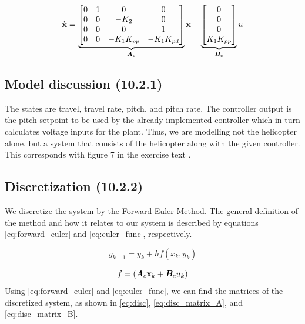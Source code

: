 \begin{equation}\label{eq:state_space_matrices}
	\mathbf{\dot{x}} =
	\underbrace{
		\begin{bmatrix}
			0 & 1 & 0 				& 0 \\
			0 & 0 & -K_{2} 			& 0 \\
			0 & 0 & 0 				& 1 \\
			0 & 0 & -K_{1}K_{pp}	& -K_{1}K_{pd}
		\end{bmatrix}
	}_{\bm{A}_{c}}
	\mathbf{x} +
	\underbrace{
		\begin{bmatrix}
			0 \\ 0 \\ 0 \\ K_{1}K_{pp}
		\end{bmatrix}
	}_{\bm{B}_{c}}
	u
\end{equation}


\subsection{Model discussion (10.2.1)}
The states are travel, travel rate, pitch, and pitch rate. The controller output is the pitch setpoint to be used by the already implemented controller which in turn calculates voltage inputs for the plant. Thus, we are modelling not the helicopter alone, but a system that consists of the helicopter along with the given controller. This corresponds with figure 7 in the exercise text \cite{_helicopter_2015}.


\subsection{Discretization (10.2.2)}\label{sec:disc1}
We discretize the system by the Forward Euler Method. The general definition of the method and how it relates to our system is described by equations \eqref{eq:forward_euler} and \eqref{eq:euler_func}, respectively.

\begin{equation}\label{eq:forward_euler}
	y_{k+1} = y_{k} + h f(x_{k}, y_{k})
\end{equation}

\begin{equation}\label{eq:euler_func}
	f = \left( \bm{A}_{c} \mathbf{x}_{k} + \bm{B}_c u_{k} \right)
\end{equation}
Using \eqref{eq:forward_euler} and \eqref{eq:euler_func}, we can find the matrices of the discretized system, as shown in \eqref{eq:disc}, \eqref{eq:disc_matrix_A}, and \eqref{eq:disc_matrix_B}.

